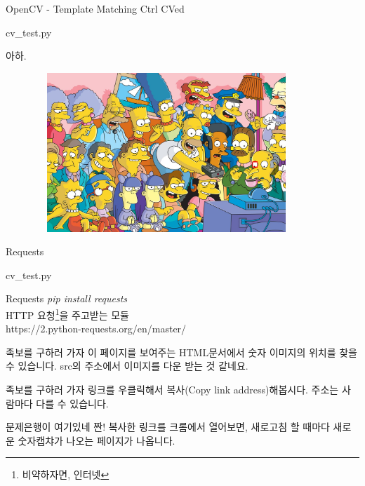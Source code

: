 \documentclass{beamer}
\begin{document}
\begin{frame}{OpenCV - Template Matching Ctrl CVed}
\begin{lstinputlisting}
  {cv_test.py}
\end{lstinputlisting}
\end{frame}

\begin{frame}{아하.}
\begin{figure}[H]
  \centering
  \includegraphics[width=100mm,height=60mm]{res.png}
\end{figure}
\end{frame}

\begin{frame}{Requests}
\begin{lstinputlisting}
  {cv_test.py}
\end{lstinputlisting}
\end{frame}

\begin{frame}{Requests}
\textit{pip install requests}\\
HTTP 요청\footnote{비약하자면, 인터넷}을 주고받는 모듈\\
https://2.python-requests.org/en/master/
\end{frame}

\begin{frame}{족보를 구하러 가자}
이 페이지를 보여주는 HTML문서에서 숫자 이미지의 위치를 찾을 수 있습니다. src의 주소에서 이미지를 다운 받는 것
  같네요.
\end{frame}

\begin{frame}{족보를 구하러 가자}
  링크를 우클릭해서 복사(Copy link address)해봅시다. 주소는 사람마다 다를 수
  있습니다. 
\end{frame}

\begin{frame}{문제은행이 여기있네}
  짠! 복사한 링크를 크롬에서 열어보면, 새로고침 할 때마다 새로운 숫자캡챠가 나오는 
  페이지가 나옵니다.
\end{frame}
\end{document}
